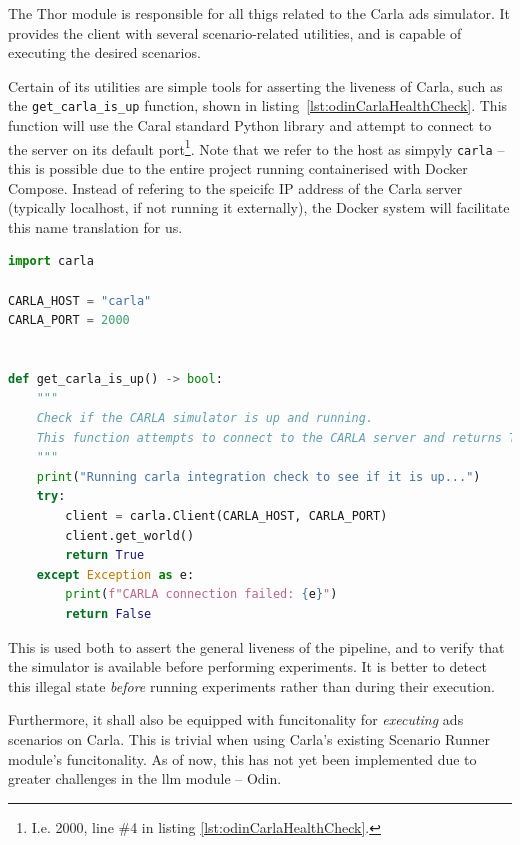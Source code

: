 The Thor module is responsible for all thigs related to the Carla \acrshort{ads}
simulator. It provides the client with several scenario-related utilities, and
is capable of executing the desired scenarios.


Certain of its utilities are simple tools for asserting the liveness of Carla,
such as the \texttt{get\_carla\_is\_up} function, shown in
listing~\ref{lst:odinCarlaHealthCheck}. This function will use the Caral
standard Python library and attempt to connect to the server on its default
port\footnote{I.e. \num{2000}, line \#4 in listing
    \ref{lst:odinCarlaHealthCheck}.}. Note that we refer to the host as simpyly
\texttt{carla} -- this is possible due to the entire project running
containerised with Docker Compose. Instead of refering to the speicifc IP
address of the Carla server (typically localhost, if not running it externally),
the Docker system will facilitate this name translation for us.

\begin{lstlisting}[caption={Exerpt from carla\_interface.py, demonstrating the implementation of a Carla health check.}, label={lst:odinCarlaHealthCheck}, language={Python}]
import carla

CARLA_HOST = "carla"
CARLA_PORT = 2000


def get_carla_is_up() -> bool:
    """
    Check if the CARLA simulator is up and running.
    This function attempts to connect to the CARLA server and returns True if successful, otherwise False.
    """
    print("Running carla integration check to see if it is up...")
    try:
        client = carla.Client(CARLA_HOST, CARLA_PORT)
        client.get_world()
        return True
    except Exception as e:
        print(f"CARLA connection failed: {e}")
        return False
\end{lstlisting}

This is used both to assert the general liveness of the \hefe pipeline, and to
verify that the simulator is available before performing experiments. It is
better to detect this illegal state \emph{before} running experiments rather
than during their execution.

Furthermore, it shall also be equipped with funcitonality for \emph{executing} \acrshort{ads}
scenarios on Carla. This is trivial when using Carla's existing Scenario Runner
module's funcitonality. As of now, this has not yet been implemented due to
greater challenges in the \acrshort{llm} module -- Odin.



